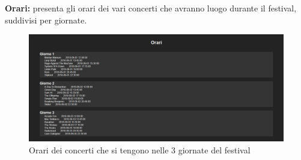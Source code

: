 \documentclass[10pt, a4paper]{article}
\begin{document}
\newpage

\begin{flushleft} \textbf{Orari: }presenta gli orari dei vari concerti che avranno luogo durante il festival, suddivisi per giornate. \end{flushleft}
\begin{figure}[h!]
 \centering
  \includegraphics[width=1\textwidth]{Images/orari.png}
  \caption{Orari dei concerti che si tengono nelle 3 giornate del festival}
  \label{fig:orari}
\end{figure}
\end{document}
